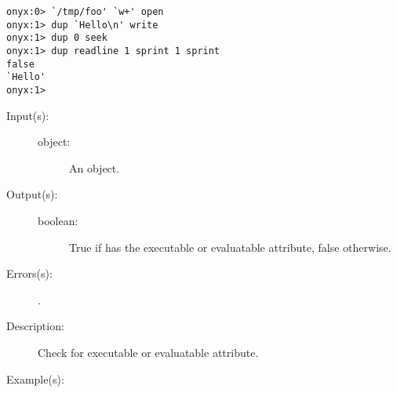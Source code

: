 \begin{description}
\begin{description}
\begin{verbatim}
onyx:0> `/tmp/foo' `w+' open
onyx:1> dup `Hello\n' write
onyx:1> dup 0 seek
onyx:1> dup readline 1 sprint 1 sprint
false
`Hello'
onyx:1>
		\end{verbatim}
	\end{description}
\label{systemdict:xcheck}
\item[{\onyxop{object}{xcheck}{boolean}}: ]
	\begin{description}\item[]
	\item[Input(s): ]
		\begin{description}\item[]
		\item[object: ]
			An object.
		\end{description}
	\item[Output(s): ]
		\begin{description}\item[]
		\item[boolean: ]
			True if  has the executable or evaluatable
			attribute, false otherwise.
		\end{description}
	\item[Errors(s): ]
		\begin{description}\item[]
		\item[.]
		\end{description}
	\item[Description: ]
		Check  for executable or evaluatable attribute.
	\item[Example(s): ]\begin{verbatim}


\end{verbatim}
\end{description}
\end{description}
